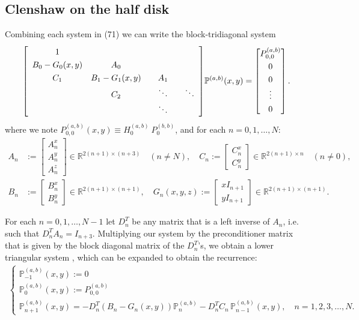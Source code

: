 \documentclass[11pt, oneside]{article}   	%
\newcommand{\R}{\mathbb{R}}
\newcommand{\bigP}{\mathbb{P}}
\newcommand{\bigPab}{\bigP^{(a,b)}}
\newcommand{\Dnt}{D^T_n}
\begin{document}
\subsection{Clenshaw on the half disk}

Combining each system in (71) we can write the block-tridiagonal system
\begin{align}
\renewcommand\arraystretch{1.3}
\mleft[
\begin{array}{cccc}
		1 & & & \\
		B_0-G_0(x,y) & A_0 & & \\
		C_1 & B_1-G_1(x,y) & \quad A_1 \quad & \\
		& C_2 & \ddots & \ddots \\
		& & \ddots &
\end{array}
\mright]
\bigPab(x,y)
=
\begin{bmatrix}
	P^{(a,b)}_{0,0} \\ 0 \\ 0 \\ \vdots \\ 0 \\
\end{bmatrix}.
\end{align}
where we note \(P^{(a,b)}_{0,0}(x,y) \equiv H_0^{(a,b)} \: P_0^{(b,b)}\), and for each \(n = 0,1,\dots,N\):
\begin{align}
A_n &:= \begin{bmatrix}
		A^x_n \\
		A^y_n \\
		A^z_n
	    \end{bmatrix} \in \R^{2(n+1)\times(n+3)} \quad (n \ne N), \quad
C_n := \begin{bmatrix}
		C^x_n \\
		C^y_n
	    \end{bmatrix} \in \R^{2(n+1)\times n} \quad (n \ne 0), \nonumber \\
B_n &:= \begin{bmatrix}
		B^x_n \\
		B^y_n
	    \end{bmatrix} \in \R^{2(n+1)\times(n+1)}, \quad
G_n(x,y,z) := \begin{bmatrix}
		xI_{n+1} \\
		yI_{n+1}
	    \end{bmatrix} \in \R^{2(n+1)\times(n+1)}.
\end{align}
 
For each \(n = 0,1,\dots,N-1\) let \(\Dnt\) be any matrix that is a left inverse of \(A_n\), i.e. such that \(\Dnt A_n = I_{n+3}\). Multiplying our system by the preconditioner matrix that is given by the block diagonal matrix of the \(\Dnt\)'s, we obtain a lower triangular system \citep{dunkl2014orthogonal}, which can be expanded to obtain the recurrence:
\begin{align}
\begin{cases}
\bigPab_{-1}(x,y) := 0 \\
\bigPab_{0}(x,y) := P^{(a,b)}_{0,0} \\
\bigPab_{n+1}(x,y) = -\Dnt (B_n-G_n(x,y)) \bigPab_n - \Dnt C_n  \,\bigPab_{n-1}(x,y), \quad n = 1,2,3,\dots,N.
\end{cases}
\end{align}
\end{document}
